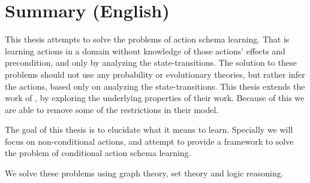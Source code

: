 \chapter{Summary (English)}


This thesis attempts to solve the problems of action schema learning.
That is learning actions in a domain without knowledge of those actions' effects and precondition, and only by analyzing the state-transitions. The solution to these problems should not use any probability or evolutionary theories, but rather infer the actions, based only on analyzing the state-transitions. 
This thesis extends the work of \cite{Walsh2008},
by exploring the underlying properties of their work.
Because of this we are able to remove some of the restrictions in their model.

The goal of this thesis is to elucidate what it means to learn. Specially we will focus on non-conditional actions, and attempt to provide a framework to solve the problem of conditional action schema learning.

We solve these problems using graph theory, set theory and logic reasoning.

